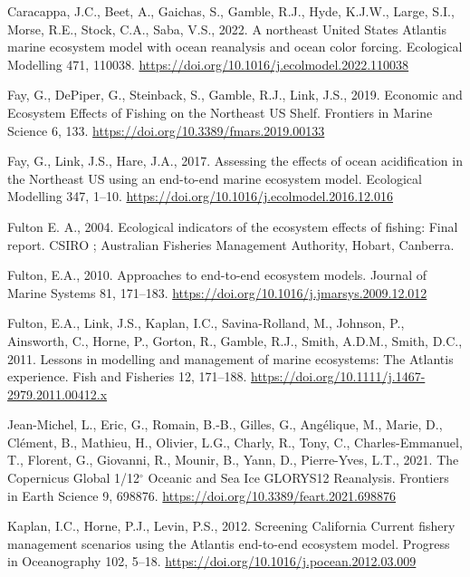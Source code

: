 \documentclass[
]{article}
\newlength{\cslhangindent}
\newenvironment{CSLReferences}[2] %
 {\begin{list}{}{%
  \setlength{\itemindent}{0pt}
  \setlength{\leftmargin}{0pt}
  \setlength{\parsep}{0pt}
  \ifodd #1
   \setlength{\leftmargin}{\cslhangindent}
   \setlength{\itemindent}{-1\cslhangindent}
  \fi
  \setlength{\itemsep}{#2\baselineskip}}}
 {\end{list}}
\begin{document}
\label{refs}
\begin{CSLReferences}{1}{0}
Caracappa, J.C., Beet, A., Gaichas, S., Gamble, R.J., Hyde, K.J.W., Large, S.I., Morse, R.E., Stock, C.A., Saba, V.S., 2022. A northeast {United States Atlantis} marine ecosystem model with ocean reanalysis and ocean color forcing. Ecological Modelling 471, 110038. \url{https://doi.org/10.1016/j.ecolmodel.2022.110038}

Fay, G., DePiper, G., Steinback, S., Gamble, R.J., Link, J.S., 2019. Economic and {Ecosystem Effects} of {Fishing} on the {Northeast US Shelf}. Frontiers in Marine Science 6, 133. \url{https://doi.org/10.3389/fmars.2019.00133}

Fay, G., Link, J.S., Hare, J.A., 2017. Assessing the effects of ocean acidification in the {Northeast US} using an end-to-end marine ecosystem model. Ecological Modelling 347, 1--10. \url{https://doi.org/10.1016/j.ecolmodel.2016.12.016}

Fulton E. A., 2004. Ecological indicators of the ecosystem effects of fishing: Final report. CSIRO ; Australian Fisheries Management Authority, Hobart, Canberra.

Fulton, E.A., 2010. Approaches to end-to-end ecosystem models. Journal of Marine Systems 81, 171--183. \url{https://doi.org/10.1016/j.jmarsys.2009.12.012}

Fulton, E.A., Link, J.S., Kaplan, I.C., Savina-Rolland, M., Johnson, P., Ainsworth, C., Horne, P., Gorton, R., Gamble, R.J., Smith, A.D.M., Smith, D.C., 2011. Lessons in modelling and management of marine ecosystems: The {Atlantis} experience. Fish and Fisheries 12, 171--188. \url{https://doi.org/10.1111/j.1467-2979.2011.00412.x}

Jean-Michel, L., Eric, G., Romain, B.-B., Gilles, G., Angélique, M., Marie, D., Clément, B., Mathieu, H., Olivier, L.G., Charly, R., Tony, C., Charles-Emmanuel, T., Florent, G., Giovanni, R., Mounir, B., Yann, D., Pierre-Yves, L.T., 2021. The {Copernicus Global} 1/12{\(^\circ\)} {Oceanic} and {Sea Ice GLORYS12 Reanalysis}. Frontiers in Earth Science 9, 698876. \url{https://doi.org/10.3389/feart.2021.698876}

Kaplan, I.C., Horne, P.J., Levin, P.S., 2012. Screening {California Current} fishery management scenarios using the {Atlantis} end-to-end ecosystem model. Progress in Oceanography 102, 5--18. \url{https://doi.org/10.1016/j.pocean.2012.03.009}


\end{CSLReferences}
\end{document}
